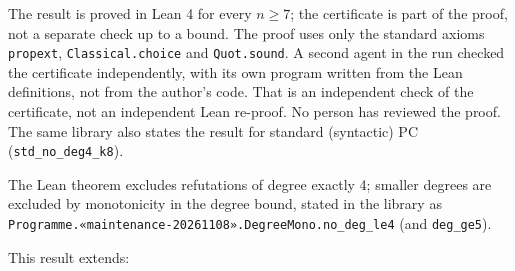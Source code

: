 \documentclass{article}
\begin{document}
The result is proved in Lean 4 for every $n\ge7$; the certificate is part of the proof, not a
separate check up to a bound. The proof uses only the standard axioms \texttt{propext},
\texttt{Classical.choice} and \texttt{Quot.sound}. A second agent in the run checked the certificate
independently, with its own program written from the Lean definitions, not from the author's
code. That is an independent check of the certificate, not an independent Lean re-proof. No
person has reviewed the proof. The same library also states the result for standard (syntactic)
PC (\texttt{std\_no\_deg4\_k8}).

The Lean theorem excludes refutations of degree exactly 4; smaller degrees are excluded by monotonicity in
the degree bound, stated in the library as \texttt{Programme.«maintenance-20261108».DegreeMono.no\_deg\_le4} (and \texttt{deg\_ge5}).

This result extends:
\end{document}
